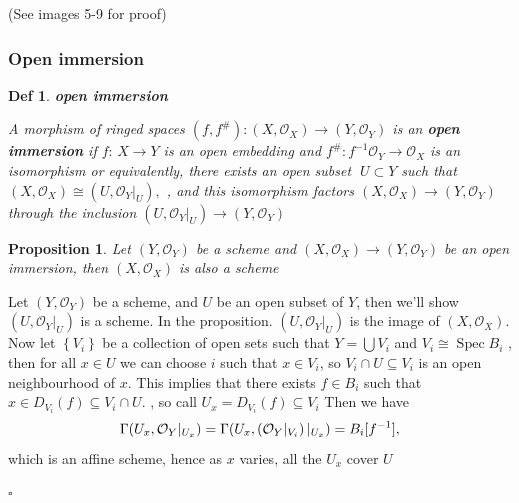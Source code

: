 \documentclass{article}
\newtheorem{definition}[theorem]{Def}
\newtheorem{proposition}[theorem]{Proposition}
\newtheorem{remark}[theorem]{Remark}
\newenvironment{Proof}{{\noindent \indent \it Proof:\quad}}{\hfill $\square$\par}
\begin{document}
(See images 5-9 for proof)

\newpage


\subsubsection{Open immersion}
\begin{definition}
\textbf{open immersion}

    A morphism of ringed spaces $(f,f^{\#}):(X,{\mathcal O}_{X})\to(Y,{\mathcal O}_{Y})$ is an \textbf{open immersion} if $f:\,X\to Y$ is an open embedding and $f^{\#}:f^{-1}\mathcal{O}_{Y} \rightarrow\mathcal{O}_{X}$ is an isomorphism or equivalently, there exists an open subset $\;U\subset Y$ such that $(X,{\mathcal O}_{X})\cong({U},{\mathcal O}_{Y}|_{U}),$ , and this isomorphism factors $(X,{\mathcal{O}}_{X})\to(Y,{\mathcal{O}}_{Y})$ through the inclusion $(U,{\mathcal{O}}_{Y}|_{U})\to(Y,{\mathcal{O}}_{Y})$ 
\end{definition}

\begin{proposition}
    Let $(Y,{\mathcal{O}}_{Y})$ be a scheme and $(X,{\mathcal{O}}_{X})\to(Y,{\mathcal{O}}_{Y})$ be an open immersion, then $(X,{\mathcal{O}}_{X})$ is also a scheme 
\end{proposition}
\begin{Proof}
    Let $(Y,{\mathcal{O}}_{Y})$ be a scheme, and $U$ be an open subset of $Y$, then we'll show $(U,{\mathcal{O}}_{Y}|_{U})$ is a scheme. In the proposition. $(U,{\mathcal{O}}_{Y}|_{U})$ is the image of $(X,{\mathcal{O}}_{X})$. Now let $\left\{{\mathit{V}}_{i}\right\}$ be a collection of open sets such that $Y=\bigcup{V}_{i}$ and $V_{i}\cong\operatorname{Spec}B_{i}$ , then for all $x\in U$ we can choose $i$ such that $x\in V_{i}$, so $V_{i}\cap U\subseteq V_{i}$ is an open neighbourhood of $x$. This implies that there exists $f\in B_{i}$ such that $x\in D_{V_{i}}(f)\subseteq V_{i}\cap U.$ , so call $U_{x}=D_{V_{i}}(f)\subseteq V_{i}$ Then we have
$$
\Gamma(U_{x},{\cal O}_{Y}|_{U_{x}})=\Gamma(U_{x},({\cal O}_{Y}|_{V_{i}})\,|_{U_{x}})=B_{i}[f^{-1}], 
$$
which is an affine scheme, hence as $x$ varies, all the $\textstyle{U_{x}}$ cover $U$
    
\end{Proof}
\end{document}
